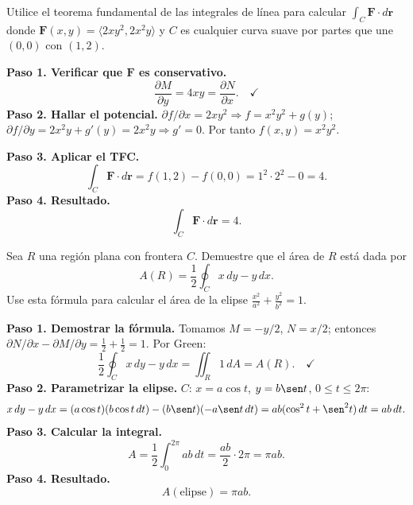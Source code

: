 \begin{prob}
Utilice el teorema fundamental de las integrales de línea para calcular
$\int_C \mathbf{F}\cdot d\mathbf{r}$ donde $\mathbf{F}(x,y) =
\langle 2xy^2, 2x^2y \rangle$ y $C$ es cualquier curva suave por partes
que une $(0,0)$ con $(1,2)$.
\begin{myproof}
\textbf{Paso 1. Verificar que $\mathbf{F}$ es conservativo.}
\[
\frac{\partial M}{\partial y}=4xy=\frac{\partial N}{\partial x}.\quad\checkmark
\]
\textbf{Paso 2. Hallar el potencial.} $\partial f/\partial x=2xy^2\Rightarrow f=x^2y^2+g(y)$;\; $\partial f/\partial y=2x^2y+g'(y)=2x^2y\Rightarrow g'=0$. Por tanto $f(x,y)=x^2y^2$.

\textbf{Paso 3. Aplicar el TFC.}
\[
\int_C\mathbf{F}\cdot d\mathbf{r}=f(1,2)-f(0,0)=1^2\cdot2^2-0=4.
\]
\textbf{Paso 4. Resultado.}
\[
\boxed{\int_C\mathbf{F}\cdot d\mathbf{r}=4.}
\]
\end{myproof}
\end{prob}



\begin{prob}
Sea $R$ una región plana con frontera $C$. Demuestre que el área de $R$
está dada por
\[
A(R) = \frac{1}{2} \oint_C x\,dy - y\,dx.
\]
Use esta fórmula para calcular el área de la elipse $\frac{x^2}{a^2}
+\frac{y^2}{b^2}=1$.
\begin{myproof}
\textbf{Paso 1. Demostrar la fórmula.} Tomamos $M=-y/2$, $N=x/2$; entonces $\partial N/\partial x-\partial M/\partial y=\tfrac12+\tfrac12=1$. Por Green:
\[
\frac{1}{2}\oint_C x\,dy-y\,dx=\iint_R 1\,dA=A(R).\quad\checkmark
\]
\textbf{Paso 2. Parametrizar la elipse.} $C$: $x=a\cos t$, $y=b\sen t$, $0\le t\le2\pi$:
\[
x\,dy-y\,dx=(a\cos t)(b\cos t\,dt)-(b\sen t)(-a\sen t\,dt)=ab(\cos^2t+\sen^2t)\,dt=ab\,dt.
\]
\textbf{Paso 3. Calcular la integral.}
\[
A=\frac{1}{2}\int_0^{2\pi}ab\,dt=\frac{ab}{2}\cdot2\pi=\pi ab.
\]
\textbf{Paso 4. Resultado.}
\[
\boxed{A(\text{elipse})=\pi ab.}
\]
\end{myproof}
\end{prob}




